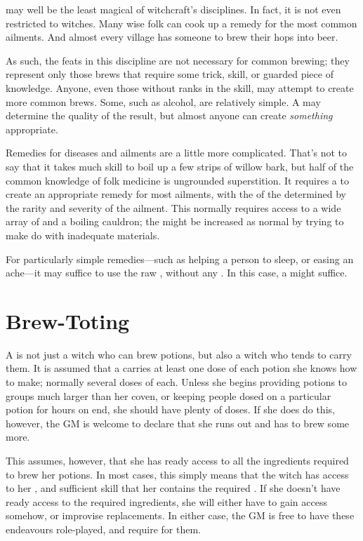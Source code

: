 
 may well be the least magical of witchcraft's disciplines.
In fact, it is not even restricted to witches.
Many wise folk can cook up a remedy for the most common ailments.
And almost every village has someone to brew their hops into beer.

As such, the feats in this discipline are not necessary for common brewing; they represent only those brews that require some trick, skill, or guarded piece of knowledge.
Anyone, even those without ranks in the  skill, may attempt to create more common brews.
Some, such as alcohol, are relatively simple.
A {\test} may determine the quality of the result, but almost anyone can create \emph{something} appropriate.

Remedies for diseases and ailments are a little more complicated.
That's not to say that it takes much skill to boil up a few strips of willow bark, but half of the common knowledge of folk medicine is ungrounded superstition.
It requires a  {\test} to create an appropriate remedy for most ailments, with the {\tn} of the {\test} determined by the rarity and severity of the ailment.
This normally requires access to a wide array of  and a boiling cauldron; the {\tn} might be increased as normal by trying to make do with inadequate materials.

For particularly simple remedies---such as helping a person to sleep, or easing an ache---it may suffice to use the raw , without any .
In this case, a  {\test} might suffice.

\section{Brew-Toting}

A  is not just a witch who can brew potions, but also a witch who tends to carry them.
It is assumed that a  carries at least one dose of each potion she knows how to make; normally several doses of each.
Unless she begins providing potions to groups much larger than her coven, or keeping people dosed on a particular potion for hours on end, she should have plenty of doses.
If she does do this, however, the GM is welcome to declare that she runs out and has to brew some more.

This assumes, however, that she has ready access to all the ingredients required to brew her potions.
In most cases, this simply means that the witch has access to her {\garden}, and sufficient  skill that her {\garden} contains the required .
If she doesn't have ready access to the required ingredients, she will either have to gain access somehow, or improvise replacements.
In either case, the GM is free to have these endeavours role-played, and require {\tests} for them.

